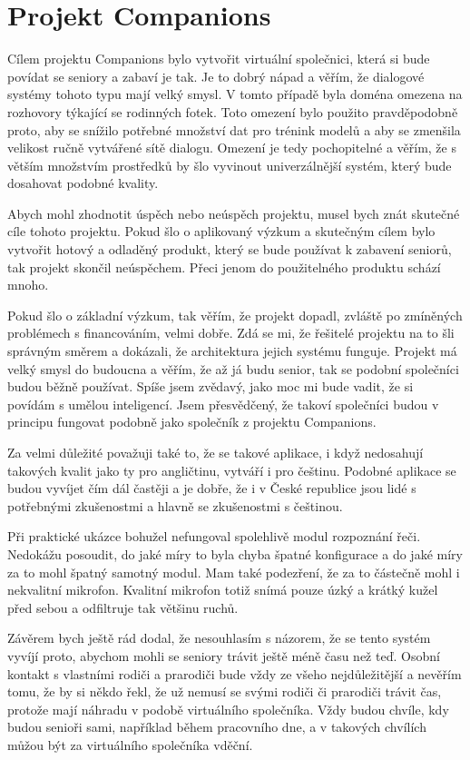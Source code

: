 \documentclass[12pt,a4paper]{report}
\begin{document}
\section*{Projekt Companions}

Cílem projektu Companions bylo vytvořit virtuální společnici, která si bude
povídat se seniory a zabaví je tak. Je to dobrý nápad a věřím, že dialogové
systémy tohoto typu mají velký smysl. V tomto případě byla doména omezena
na rozhovory týkající se rodinných fotek. Toto omezení bylo použito
pravděpodobně proto, aby se snížilo potřebné množství dat pro trénink modelů a
aby se zmenšila velikost ručně vytvářené sítě dialogu. Omezení je tedy
pochopitelné a věřím, že s větším množstvím prostředků by šlo vyvinout
univerzálnější systém, který bude dosahovat podobné kvality.

Abych mohl zhodnotit úspěch nebo neúspěch projektu, musel bych znát skutečné
cíle tohoto projektu. Pokud šlo o aplikovaný výzkum a skutečným cílem bylo
vytvořit hotový a odladěný produkt, který se bude používat k zabavení seniorů,
tak projekt skončil neúspěchem. Přeci jenom do použitelného produktu schází
mnoho.

Pokud šlo o základní výzkum, tak věřím, že projekt dopadl, zvláště po zmíněných
problémech s financováním, velmi dobře. Zdá se mi, že řešitelé projektu na to
šli správným směrem a dokázali, že architektura jejich systému funguje. Projekt
má velký smysl do budoucna a věřím, že až já budu senior, tak se podobní
společníci budou běžně používat. Spíše jsem zvědavý, jako moc mi bude vadit, že
si povídám s umělou inteligencí. Jsem přesvědčený, že takoví společníci budou v
principu fungovat podobně jako společník z projektu Companions.

Za velmi důležité považuji také to, že se takové aplikace, i když nedosahují
takových kvalit jako ty pro angličtinu, vytváří i pro češtinu. Podobné aplikace
se budou vyvíjet čím dál častěji a je dobře, že i v České republice jsou lidé s
potřebnými zkušenostmi a hlavně se zkušenostmi s češtinou.

Při praktické ukázce bohužel nefungoval spolehlivě modul rozpoznání řeči.
Nedokážu posoudit, do jaké míry to byla chyba špatné konfigurace a do jaké míry
za to mohl špatný samotný modul. Mam také podezření, že za to částečně mohl i
nekvalitní mikrofon. Kvalitní mikrofon totiž snímá pouze úzký a krátký kužel
před sebou a odfiltruje tak většinu ruchů.

Závěrem bych ještě rád dodal, že nesouhlasím s názorem, že se tento systém
vyvíjí proto, abychom mohli se seniory trávit ještě méně času než teď. Osobní
kontakt s vlastními rodiči a prarodiči bude vždy ze všeho nejdůležitější a
nevěřím tomu, že by si někdo řekl, že už nemusí se svými rodiči či prarodiči
trávit čas, protože mají náhradu v podobě virtuálního společníka. Vždy budou
chvíle, kdy budou senioři sami, například během pracovního dne, a v takových
chvílích můžou být za virtuálního společníka vděční.
\end{document}
